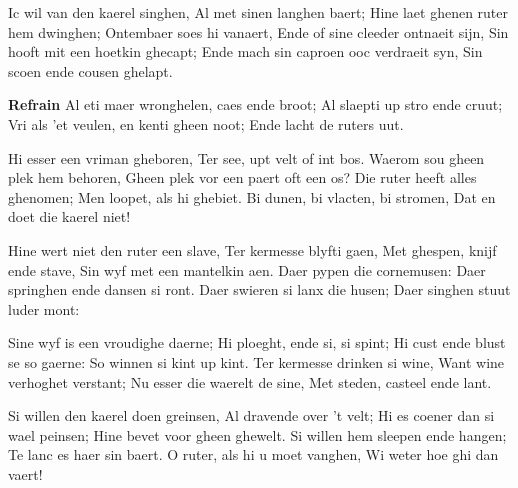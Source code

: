 \footnotemark [
ititle={Kaerelslied, het}]


\beginverse
Ic wil van den kaerel singhen,
Al met sinen langhen baert;
Hine laet ghenen ruter hem dwinghen;
Ontembaer soes hi vanaert,
Ende of sine cleeder ontnaeit sijn,
Sin hooft mit een hoetkin ghecapt;
Ende mach sin caproen ooc verdraeit syn,
Sin scoen ende cousen ghelapt.
\endverse

\beginchorus
\textbf{Refrain}
Al eti maer wronghelen, caes ende broot;
Al slaepti up stro ende cruut;
Vri als 'et veulen, en kenti gheen noot;
Ende lacht de ruters uut.
\endchorus

\beginverse
Hi esser een vriman gheboren,
Ter see, upt velt of int bos.
Waerom sou gheen plek hem behoren,
Gheen plek vor een paert oft een os?
Die ruter heeft alles ghenomen;
Men loopet, als hi ghebiet.
Bi dunen, bi vlacten, bi stromen,
Dat en doet die kaerel niet!
\endverse

\beginverse
Hine wert niet den ruter een slave,
Ter kermesse blyfti gaen,
Met ghespen, knijf ende stave,
Sin wyf met een mantelkin aen.
Daer pypen die cornemusen:
Daer springhen ende dansen si ront.
Daer swieren si lanx die husen;
Daer singhen stuut luder mont:
\endverse

\beginverse
Sine wyf is een vroudighe daerne;
Hi ploeght, ende si, si spint;
Hi cust ende blust se so gaerne:
So winnen si kint up kint.
Ter kermesse drinken si wine,
Want wine verhoghet verstant;
Nu esser die waerelt de sine,
Met steden, casteel ende lant.
\endverse

\beginverse
Si willen den kaerel doen greinsen,
Al dravende over 't velt;
Hi es coener dan si wael peinsen;
Hine bevet voor gheen ghewelt.
Si willen hem sleepen ende hangen;
Te lanc es haer sin baert.
O ruter, als hi u moet vanghen,
Wi weter hoe ghi dan vaert!
\endverse
\endsong